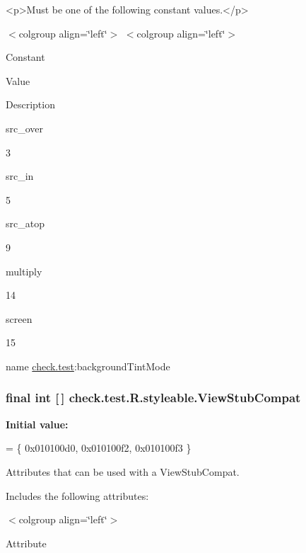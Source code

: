 \begin{DoxyVerb}      <p>Must be one of the following constant values.</p>
\end{DoxyVerb}
 \begin{TabularC}{0}
\hline
\end{TabularC}
$<$colgroup align=\char`\"{}left\char`\"{}$>$ $<$colgroup align=\char`\"{}left\char`\"{}$>$ 

Constant

Value

Description 

{\ttfamily src\+\_\+over}

3

{\ttfamily src\+\_\+in}

5

{\ttfamily src\+\_\+atop}

9

{\ttfamily multiply}

14

{\ttfamily screen}

15

name \hyperlink{namespacecheck_1_1test}{check.\+test}\+:background\+Tint\+Mode \hypertarget{classcheck_1_1test_1_1_r_1_1styleable_adf691a9cd72c9028688f92bcb9b1c303}{}
\subsubsection[{View\+Stub\+Compat}]{\setlength{\rightskip}{0pt plus 5cm}final int \mbox{[}$\,$\mbox{]} check.\+test.\+R.\+styleable.\+View\+Stub\+Compat\hspace{0.3cm}{\ttfamily [static]}}\label{classcheck_1_1test_1_1_r_1_1styleable_adf691a9cd72c9028688f92bcb9b1c303}
{\bfseries Initial value\+:}
\begin{DoxyCode}
= \{
            0x010100d0, 0x010100f2, 0x010100f3
        \}
\end{DoxyCode}
Attributes that can be used with a View\+Stub\+Compat. 

Includes the following attributes\+:

\begin{TabularC}{0}
\hline
\end{TabularC}
$<$colgroup align=\char`\"{}left\char`\"{}$>$ 

Attribute

